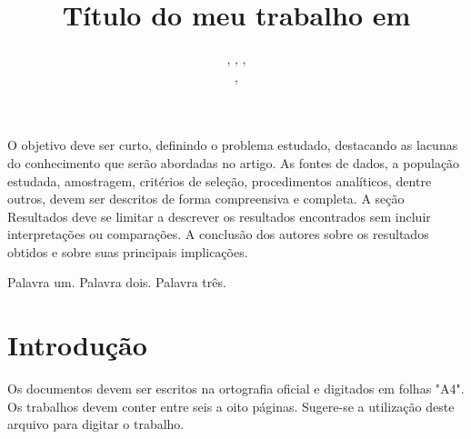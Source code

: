 \documentclass{modelo}
\newcommand{\resumotexto}  
{  
  
O objetivo deve ser curto, definindo o problema estudado, destacando as lacunas do conhecimento que serão abordadas no artigo.
As fontes de dados, a população estudada, amostragem, critérios de seleção, procedimentos analíticos, dentre outros, devem ser descritos de forma compreensiva e completa. A seção Resultados deve se limitar a descrever os resultados encontrados sem incluir interpretações ou comparações. A conclusão dos autores sobre os resultados obtidos e sobre suas principais implicações. 
}
\newcommand{\palavraschave}{Palavra um. Palavra dois. Palavra três.}
\begin{document}
 	
\title{Título do meu trabalho em \LaTeXe}
 
  	 
\author{  
 

,  
,  
,   

 
 
,  

	  

			 
} 
  


\criartitulo  
\thispagestyle{sei}  
\pagestyle{sei}

\begin{resumo}
\resumotexto
\end{resumo}  
	
\begin{keywords} 
 \palavraschave
\end{keywords} 


 
 
 
\section{Introdução}  

Os documentos devem ser escritos na ortografia oficial e digitados em folhas "A4". Os trabalhos devem conter entre seis a oito páginas. Sugere-se a utilização deste arquivo para digitar o trabalho. 
\end{document}
